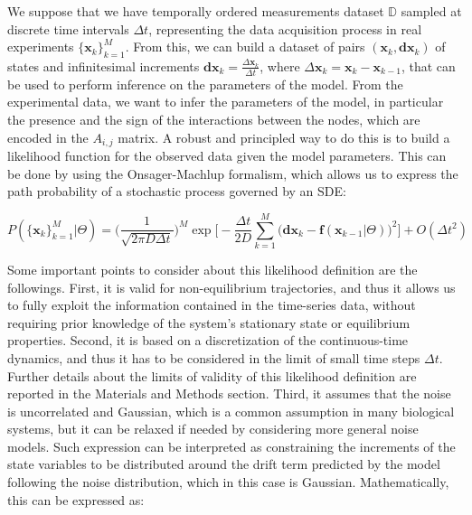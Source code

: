 \documentclass[10pt, aps, rmp,  twocolumn, superscriptaddress, floatfix, showkeys]{revtex4-2}
\begin{document}
We suppose that we have temporally ordered measurements dataset $\mathbb{D}$ sampled at discrete time intervals $\Delta t$, representing the data acquisition process in real experiments $\{\mathbf{x}_k\}_{k=1}^M$. From this, we can build a dataset of pairs $(\mathbf{x}_k, \mathbf{dx}_k)$ of states and infinitesimal increments $\mathbf{dx}_k = \frac{\Delta \mathbf{x}_k}{\Delta t}$, where $\Delta \mathbf{x}_k = \mathbf{x}_k - \mathbf{x}_{k-1}$, that can be used to perform inference on the parameters of the model.
From the experimental data, we want to infer the parameters of the model, in particular the presence and the sign of the interactions between the nodes, which are encoded in the $A_{i,j}$ matrix. A robust and principled way to do this is to build a likelihood function for the observed data given the model parameters. This can be done by using the Onsager-Machlup formalism, which allows us to express the path probability of a stochastic process governed by an SDE:

\begin{widetext}
    \begin{equation}
        P(\{\mathbf{x}_k\}_{k=1}^M|\Theta)=\Big(\frac{1}{\sqrt{2\pi D\Delta t}}\Big)^M\exp\Big[-\frac{\Delta t}{2D}\sum_{k=1}^M\Big(\mathbf{dx}_k-\mathbf{f}(\mathbf{x}_{k-1}|\Theta)\Big)^2\Big]+O(\Delta t^2)
        \label{eq:pathprob}
    \end{equation}
\end{widetext}

Some important points to consider about this likelihood definition are the followings. First, it is valid for non-equilibrium trajectories, and thus it allows us to fully exploit the information contained in the time-series data, without requiring prior knowledge of the system's stationary state or equilibrium properties. Second, it is based on a discretization of the continuous-time dynamics, and thus it has to be considered in the limit of small time steps $\Delta t$. Further details about the limits of validity of this likelihood definition are reported in the Materials and Methods section. Third, it assumes that the noise is uncorrelated and Gaussian, which is a common assumption in many biological systems, but it can be relaxed if needed by considering more general noise models. Such expression can be interpreted as constraining the increments of the state variables to be distributed around the drift term predicted by the model following the noise distribution, which in this case is Gaussian. Mathematically, this can be expressed as:
\end{document}
